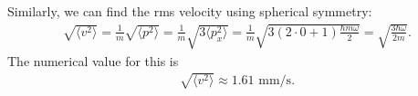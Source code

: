 \documentclass{article}
\theoremstyle{definition}
\newcommand{\f}[2]{\frac{#1}{#2}}
\begin{document}
\begin{enumerate}[label=\alph*)]
	
	Similarly, we can find the rms velocity using spherical symmetry:
	\begin{align*}
	\sqrt{\langle v^2 \rangle} = \f{1}{m}\sqrt{\langle p^2 \rangle} = \f{1}{m}\sqrt{3\langle p_x^2 \rangle} = \f{1}{m}\sqrt{3(2\cdot 0 + 1) \f{\hbar m \omega}{2}} = \sqrt{\f{3\hbar \omega}{2m}}.
	\end{align*}
	The numerical value for this is
	\begin{align*}
	\sqrt{\langle v^2 \rangle} \approx 1.61 \text{ mm/s}.
	\end{align*}

\end{enumerate}
\end{document}
